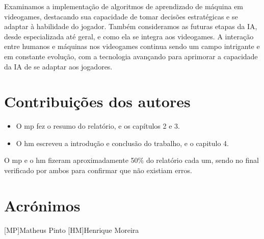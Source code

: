 \documentclass[a4paper]{report}
\begin{document}
Examinamos a implementação de algoritmos de aprendizado de máquina em videogames, destacando sua capacidade de tomar decisões estratégicas e se adaptar à habilidade do jogador. Também consideramos as futuras etapas da \ac{IA}, desde especializada até geral, e como ela se integra aos videogames. A interação entre humanos e máquinas nos videogames continua sendo um campo intrigante e em constante evolução, com a tecnologia avançando para aprimorar a capacidade da \ac{IA} de se adaptar aos jogadores.

\chapter*{Contribuições dos autores}
\begin{itemize}

\item O \ac{mp} fez o resumo do relatório, e os capítulos 2 e 3.

\item O \ac{hm} escreveu a introdução e conclusão do trabalho, e o capitulo 4.
\end{itemize}
O \ac{mp} e o \ac{hm} fizeram aproximadamente 50\% do relatório cada um, sendo no final verificado por ambos para confirmar que não existiam erros.

\chapter*{Acrónimos}
\begin{acronym}
[MP]{Matheus Pinto}
[HM]{Henrique Moreira}
\end{acronym}
\printbibliography
\end{document}

